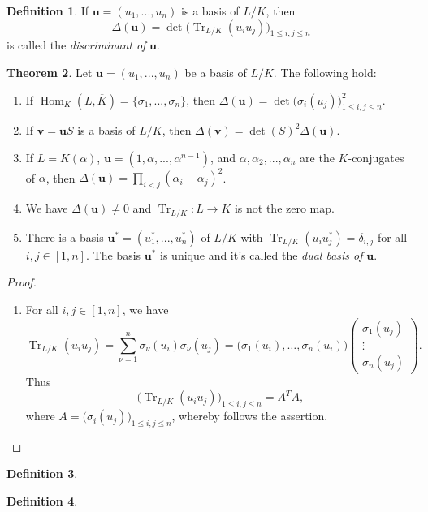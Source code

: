 \documentclass[12pt,a4paper]{report}
\theoremstyle{definition}
\newtheorem{theorem}{Theorem}[chapter] %
\newtheorem{defn}[theorem]{Definition}
\theoremstyle{num.custom-title}
\DeclareMathOperator{\Hom}{Hom}
\DeclareMathOperator{\Tr}{Tr}
\newcommand{\ol}{\overline}
\renewcommand{\u}{\mathbf{u}}
\begin{document}
\begin{defn}
If $\u = (u_1,...,u_n)$ is a basis of $L/K$, then
\[
\Delta(\u) = \det \Big( \Tr_{L/K}(u_i u_j) \Big)_{1 \leq i,j \leq n}
\]
is called the \emph{discriminant of} $\u$.
\end{defn}

\begin{theorem}
Let $\u = (u_1,...,u_n)$ be a basis of $L/K$. The following hold:
\begin{enumerate}
\item If $\Hom_K(L,\ol{K}) = \{\sigma_1,...,\sigma_n\}$, then $\Delta(\u) = \det \Big( \sigma_i(u_j) \Big)_{1 \leq i,j \leq n}^2$.
\item If $\mathbf{v}=\u S$ is a basis of $L/K$, then $\Delta(\mathbf{v}) = \det(S)^2 \Delta(\u)$.
\item If $L=K(\alpha)$, $\u=(1,\alpha,...,\alpha^{n-1})$, and $\alpha,\alpha_2,...,\alpha_n$ are the $K$-conjugates of $\alpha$, then $\Delta(\u) = \prod_{i<j}(\alpha_i - \alpha_j)^2$.
\item We have $\Delta(\u) \neq 0$ and $\Tr_{L/K} : L \to K$ is not the zero map.
\item There is a basis $\u^* = (u_1^*,...,u_n^*)$ of $L/K$ with $\Tr_{L/K}(u_i u_j^*) = \delta_{i,j}$ for all $i,j \in [1,n]$. The basis $\u^*$ is unique and it's called the \emph{dual basis of} $\u$.
\end{enumerate}
\begin{proof}\ 
\begin{enumerate}
\item For all $i,j \in [1,n]$, we have
\[
\Tr_{L/K}(u_i u_j) = \sum_{\nu=1}^n \sigma_\nu(u_i) \sigma_\nu(u_j) = \Big( \sigma_1(u_i), \ldots ,\sigma_n(u_i) \Big)
\begin{pmatrix}
\sigma_1(u_j) \\
\vdots \\
\sigma_n(u_j)
\end{pmatrix}.
\]
Thus
\[
\Big( \Tr_{L/K} (u_i u_j) \Big)_{1 \leq i,j \leq n} = A^T A,
\]
where $A = \Big( \sigma_i(u_j) \Big)_{1 \leq i,j \leq n}$, whereby follows the assertion.
\end{enumerate}
\end{proof}
\end{theorem}

\begin{defn}

\end{defn}

\begin{defn}

\end{defn}
\end{document}
